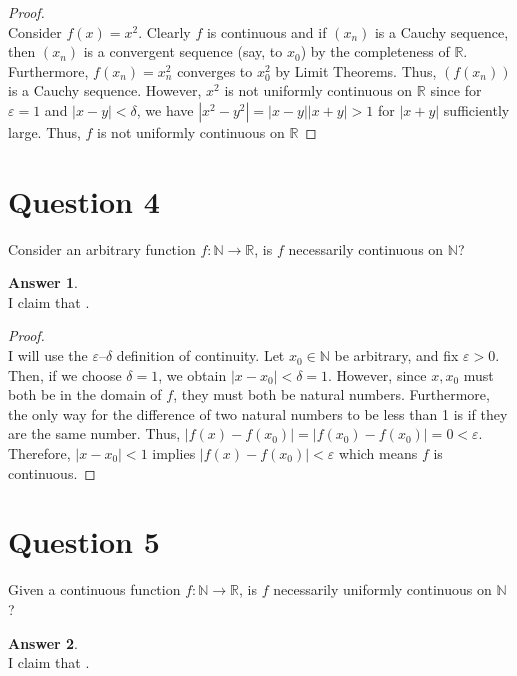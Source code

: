 \documentclass[10pt,a4paper]{article}
\theoremstyle{definition}
\newtheorem*{answer*}{Answer}
\begin{document}
\begin{proof}{$ $}
\\Consider $f(x) = x^2$. Clearly $f$ is continuous and if $(x_n)$ is a Cauchy sequence, then $(x_n)$ is a convergent sequence (say, to $x_0$) by the completeness of $\mathbb{R}$. Furthermore, $f(x_n) = x_n^2$ converges to $x_0^2$ by Limit Theorems. Thus, $(f(x_n))$ is a Cauchy sequence. However, $x^2$ is not uniformly continuous on $\mathbb{R}$ since for $\varepsilon = 1$ and $|x - y| < \delta$, we have $|x^2 - y^2| = |x - y||x + y| > 1$ for $|x + y|$ sufficiently large. Thus, $f$ is not uniformly continuous on $\mathbb{R}$
\end{proof}

\newpage

\section*{Question 4}
Consider an arbitrary function $f: \mathbb{N} \to \mathbb{R}$, is $f$ necessarily continuous on $\mathbb{N}$?

\begin{answer*}{$ $}
\\I claim that .
\end{answer*}

\begin{proof}{$ $}
\\I will use the $\varepsilon$--$\delta$ definition of continuity. Let $x_0 \in \mathbb{N}$ be arbitrary, and fix $\varepsilon > 0$. Then, if we choose $\delta = 1$, we obtain $|x - x_0| < \delta = 1$. However, since $x,x_0$ must both be in the domain of $f$, they must both be natural numbers. Furthermore, the only way for the difference of two natural numbers to be less than 1 is if they are the same number. Thus, $|f(x) - f(x_0)| = |f(x_0) - f(x_0)| = 0 < \varepsilon$. Therefore, $|x - x_0| < 1$ implies $|f(x) - f(x_0)| < \varepsilon$ which means $f$ is continuous. 
\end{proof}

\newpage

\section*{Question 5}
Given a continuous function $f: \mathbb{N} \to \mathbb{R}$, is $f$ necessarily uniformly continuous on $\mathbb{N}$?

\begin{answer*}{$ $}
\\I claim that .
\end{answer*}
\end{document}
